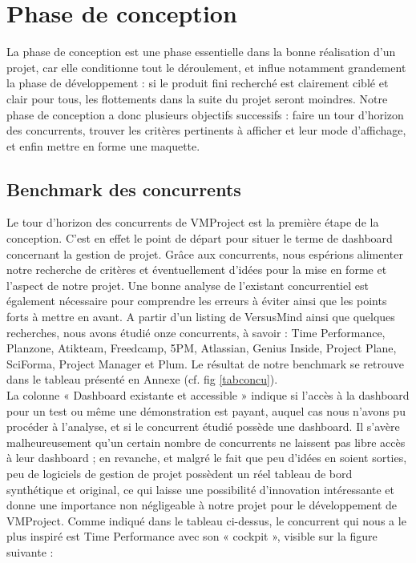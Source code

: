 \documentclass[12pt]{report}
\begin{document}
\chapter{Phase de conception}

La phase de conception est une phase essentielle dans la bonne réalisation d’un projet, car elle conditionne tout le déroulement, et influe notamment grandement la phase de développement : si le produit fini recherché est clairement ciblé et clair pour tous, les flottements dans la suite du projet seront moindres. Notre phase de conception a donc plusieurs objectifs successifs : faire un tour d’horizon des concurrents, trouver les critères pertinents à afficher et leur mode d’affichage, et enfin mettre en forme une maquette.\\

	\section{Benchmark des concurrents}

Le tour d’horizon des concurrents de VMProject est la première étape de la conception. C’est en effet le point de départ pour situer le terme de dashboard concernant la gestion de projet. Grâce aux concurrents, nous espérions alimenter notre recherche de critères et éventuellement d’idées pour la mise en forme et l’aspect de notre projet. Une bonne analyse de l’existant concurrentiel est également nécessaire pour comprendre les erreurs à éviter ainsi que les points forts à mettre en avant. A partir d’un listing de VersusMind ainsi que quelques recherches, nous avons étudié onze concurrents, à savoir : Time Performance, Planzone, Atikteam, Freedcamp, 5PM, Atlassian, Genius Inside, Project Plane, SciForma, Project Manager et Plum. Le résultat de notre benchmark se retrouve dans le tableau présenté en Annexe (cf. fig \ref{tabconcu}).\\

La colonne « Dashboard existante et accessible » indique si l’accès à la dashboard pour un test ou même une démonstration est payant, auquel cas nous n’avons pu procéder à l’analyse, et si le concurrent étudié possède une dashboard. Il s’avère malheureusement qu’un certain nombre de concurrents ne laissent pas libre accès à leur dashboard ; en revanche, et malgré le fait que peu d’idées en soient sorties, peu de logiciels de gestion de projet possèdent un réel tableau de bord synthétique et original, ce qui laisse une possibilité d’innovation intéressante et donne une importance non négligeable à notre projet pour le développement de VMProject. Comme indiqué dans le tableau ci-dessus, le concurrent qui nous a le plus inspiré est Time Performance avec son « cockpit », visible sur la figure suivante : \\
\end{document}
